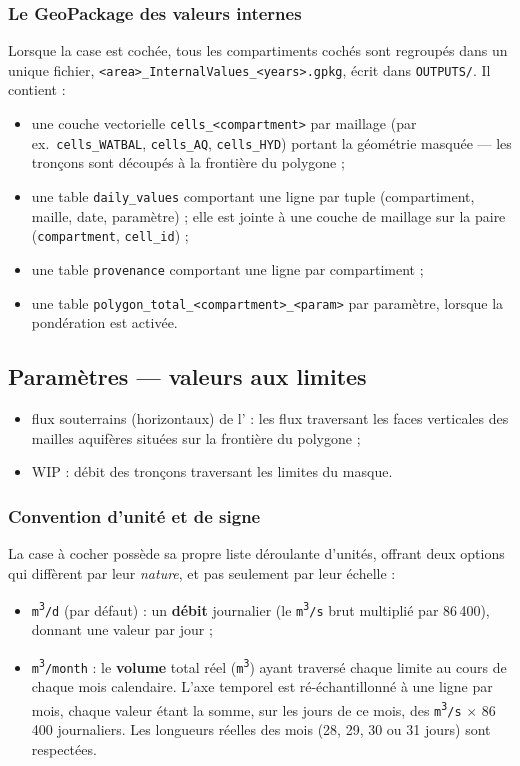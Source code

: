 \subsubsection*{Le GeoPackage des valeurs internes}
\label{sec-extract-internal-gpkg}
Lorsque la case  est cochée, tous les compartiments cochés sont regroupés dans un unique fichier, \texttt{<area>\_InternalValues\_<years>.gpkg}, écrit dans \texttt{OUTPUTS/}. Il contient :
\begin{itemize}
    \item une couche vectorielle \texttt{cells\_<compartment>} par maillage (par ex.\ \texttt{cells\_WATBAL}, \texttt{cells\_AQ}, \texttt{cells\_HYD}) portant la géométrie masquée --- les tronçons  sont découpés à la frontière du polygone ;
    \item une table \texttt{daily\_values} comportant une ligne par tuple (compartiment, maille, date, paramètre) ; elle est jointe à une couche de maillage sur la paire (\texttt{compartment}, \texttt{cell\_id}) ;
    \item une table \texttt{provenance} comportant une ligne par compartiment ;
    \item une table \texttt{polygon\_total\_<compartment>\_<param>} par paramètre, lorsque la pondération est activée.
\end{itemize}

\subsection{Paramètres --- valeurs aux limites}
\label{sec-extract-boundary}
\begin{itemize}
    \item flux souterrains (horizontaux) de l' : les flux traversant les faces verticales des mailles aquifères situées sur la frontière du polygone ;
    \item {} WIP : débit des tronçons traversant les limites du masque.
\end{itemize}

\subsubsection*{Convention d'unité et de signe}
La case à cocher  possède sa propre liste déroulante d'unités, offrant deux options qui diffèrent par leur \emph{nature}, et pas seulement par leur échelle :
\begin{itemize}
    \item \texttt{m\textsuperscript{3}/d} (par défaut) : un \textbf{débit} journalier (le \texttt{m\textsuperscript{3}/s} brut multiplié par 86\,400), donnant une valeur par jour ;
    \item \texttt{m\textsuperscript{3}/month} : le \textbf{volume} total réel (\texttt{m\textsuperscript{3}}) ayant traversé chaque limite au cours de chaque mois calendaire. L'axe temporel est ré-échantillonné à une ligne par mois, chaque valeur étant la somme, sur les jours de ce mois, des \texttt{m\textsuperscript{3}/s} $\times$ 86\,400 journaliers. Les longueurs réelles des mois (28, 29, 30 ou 31 jours) sont respectées.
\end{itemize}

